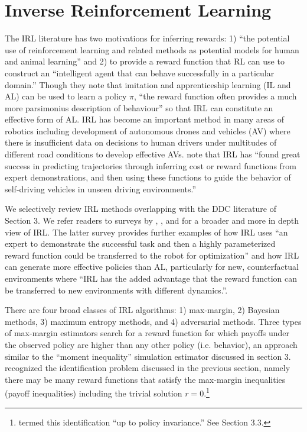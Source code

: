 
\section{Inverse Reinforcement Learning\label{sec:irl}}

The IRL literature \citep{ng:2000} has two motivations for inferring rewards: 1) ``the potential use of reinforcement learning and
related methods as potential models for human and animal learning'' and 2) to provide a reward function
that RL can use to construct an ``intelligent agent that can behave successfully in a particular domain.'' Though
they note that imitation and apprenticeship learning (IL and AL) can be used to learn a policy $\pi$, ``the reward
function often provides a much more parsimonius description of behaviour'' so that IRL can constitute an effective
form of AL. IRL has become an important method in many areas of robotics including development of autonomous 
drones and vehicles (AV) where there is insufficient data on decisions to human drivers under multitudes of different
road conditions to develop effective AVs.  \citet{av:2025} note that IRL has ``found great success in predicting 
trajectories through inferring cost or reward functions from expert demonstrations, 
and then using these functions to guide the behavior of self-driving vehicles in unseen driving environments.''

We selectively review IRL methods overlapping with the DDC literature of Section 3. We refer readers to surveys 
by \citet{arora:2021}, \citet{gleave:2022}, and \citet{adams:2022} for a broader and more in depth view of IRL.
The latter survey
provides further examples of how IRL uses  ``an expert to demonstrate the successful task and then a highly parameterized reward function could be transferred to the robot for optimization'' and how IRL can generate more effective policies than AL, particularly
for new, counterfactual environments where
``IRL has the added advantage that the reward function can be transferred to new environments with different dynamics.''.

There are four broad classes of IRL algorithms: 1) max-margin, 2) Bayesian methods, 3) maximum entropy methods, and 4) adversarial methods.
Three types of max-margin estimators \citep{ng:2000}
search for a reward function for which payoffs under the observed policy are
higher than any other policy (i.e. behavior), an approach similar to the ``moment inequality'' simulation
estimator \citep{bbl:2007} discussed in section 3. \citet{ng:2000} recognized the identification problem discussed
in the previous section, namely there may be many reward functions that satisfy the max-margin inequalities (payoff inequalities)
including the trivial solution $r=0$.\footnote{\footnotesize \citet{ng:2000} termed this identification ``up to policy invariance.'' See Section 3.3.}

